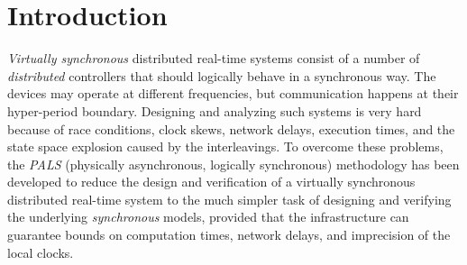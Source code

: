 

\section{Introduction}

\emph{Virtually synchronous} distributed real-time systems consist of
a number of \emph{distributed} controllers that should logically
behave in a synchronous way. The devices may operate at different
 frequencies, but  communication happens at their hyper-period
boundary.
Designing and analyzing  such systems is very hard because
of race conditions, clock skews, network delays, execution times, and
the state space explosion caused by the interleavings. To overcome
these problems, 
the \emph{PALS} (physically asynchronous, logically synchronous) methodology
\cite{pals-rtss09,mr-pals-journal,pals-tcs,al2012pattern} has been
developed to reduce the design and verification of a virtually
synchronous distributed real-time system to the much simpler task  of designing and
verifying the underlying \emph{synchronous} models,
provided that the  infrastructure can guarantee bounds
on computation times, network delays, and imprecision of the local clocks.






